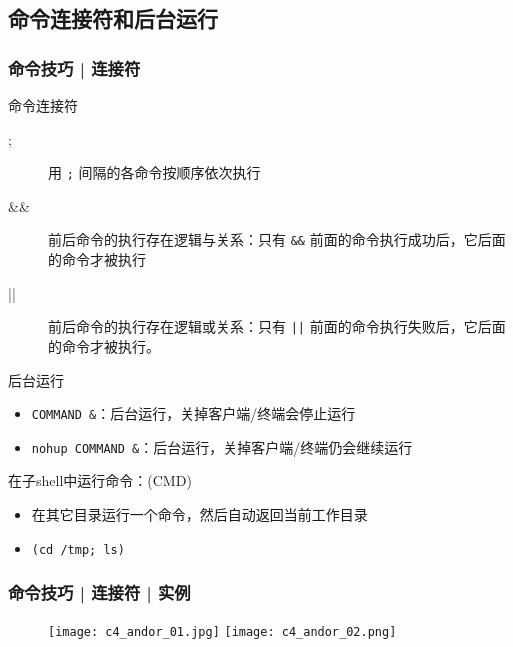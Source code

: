 \subsection{命令连接符和后台运行}
\begin{frame}[fragile]
  \frametitle{命令技巧 | \alert{连接符}}
  \begin{block}{命令连接符}
    \begin{description}
      \item[;] 用 \verb|;| 间隔的各命令按顺序依次执行
      \item[\&\&] 前后命令的执行存在逻辑与关系：只有 \verb|&&| 前面的命令执行成功后，它后面的命令才被执行
      \item[||] 前后命令的执行存在逻辑或关系：只有 \verb=||= 前面的命令执行失败后，它后面的命令才被执行。
    \end{description}
  \end{block}
  \pause
  \vspace{-0.5em}
  \begin{block}{后台运行}
    \begin{itemize}
      \item \verb|COMMAND &|：后台运行，关掉客户端/终端会停止运行
      \item \verb|nohup COMMAND &|：后台运行，关掉客户端/终端仍会继续运行
    \end{itemize}
  \end{block}
  \pause
  \vspace{-0.5em}
  \begin{block}{在子shell中运行命令：(CMD)}
    \begin{itemize}
      \item 在其它目录运行一个命令，然后自动返回当前工作目录
      \item \verb|(cd /tmp; ls)|
    \end{itemize}
  \end{block}
\end{frame}

\begin{frame}
  \frametitle{命令技巧 | 连接符 | 实例}
  \begin{figure}
  \centering
    \texttt{[image: c4\_andor\_01.jpg]}
    \vspace{0.3cm}
    \texttt{[image: c4\_andor\_02.png]}
  \end{figure}
\end{frame}

